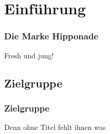 \section{Einführung} 
\begin{frame}
	\frametitle{Die Marke Hipponade} 
	Fresh und jung!
\end{frame}

\subsection{Zielgruppe}
\begin{frame}
	\frametitle{Zielgruppe}
	Denn ohne Titel fehlt ihnen was
\end{frame}